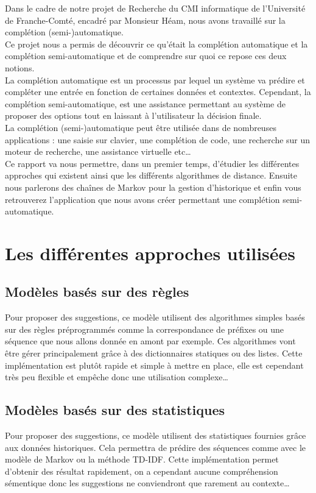 \documentclass[a4paper, 11pt]{report}
\begin{document}
Dans le cadre de notre projet de Recherche du CMI informatique de l’Université de Franche-Comté, encadré par Monsieur Héam, nous avons travaillé sur la complétion (semi-)automatique. \\

Ce projet nous a permis de découvrir ce qu'était la complétion automatique et la complétion semi-automatique et de comprendre sur quoi ce repose ces deux notions. \\ 
La complétion automatique est un processus par lequel un système va prédire et compléter une entrée en fonction de certaines données et contextes. Cependant, la complétion semi-automatique, est une assistance permettant au système de proposer des options tout en laissant à l'utilisateur la décision finale. \\
La complétion (semi-)automatique peut être utilisée dans de nombreuses applications : une saisie sur clavier, une complétion de code, une recherche sur un moteur de recherche, une assistance virtuelle etc\dots \\
Ce rapport va nous permettre, dans un premier temps, d’étudier les différentes approches qui existent ainsi que  les différents algorithmes de distance. Ensuite nous parlerons  des chaînes de Markov pour la gestion d'historique et enfin vous retrouverez l'application que nous avons créer permettant une complétion semi-automatique. \\
\vfill

\chapter{Les différentes approches utilisées}

\section{Modèles basés sur des règles}
Pour proposer des suggestions, ce modèle utilisent des algorithmes simples basés sur des règles préprogrammés comme la correspondance de préfixes ou une séquence que nous allons donnée en amont par exemple. Ces algorithmes vont être gérer principalement grâce à des dictionnaires statiques ou des listes.  Cette implémentation est plutôt rapide et simple à mettre en place, elle est cependant très peu flexible et empêche donc une utilisation complexe\dots

\section{Modèles basés sur des statistiques}
Pour proposer des suggestions, ce modèle utilisent des statistiques fournies grâce aux données historiques. Cela permettra de prédire des séquences comme avec le modèle de Markov ou la méthode TD-IDF.
Cette implémentation permet d'obtenir des résultat rapidement, on a cependant aucune compréhension sémentique donc les suggestions ne conviendront que rarement au contexte\dots
\end{document}

